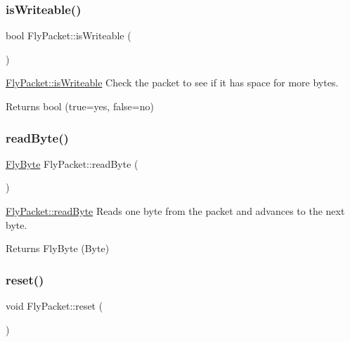 \subsubsection{\texorpdfstring{is\+Writeable()}{isWriteable()}}
{\footnotesize\ttfamily bool Fly\+Packet\+::is\+Writeable (\begin{DoxyParamCaption}{ }\end{DoxyParamCaption})}



\hyperlink{class_fly_packet_a1e63a54895660739a5232b5b546fcf07}{Fly\+Packet\+::is\+Writeable} Check the packet to see if it has space for more bytes. 

\begin{DoxyReturn}{Returns}
bool (true=yes, false=no) 
\end{DoxyReturn}
\hypertarget{class_fly_packet_af3e863f81ee5de3fb73ec200efac0924}{}\label{class_fly_packet_af3e863f81ee5de3fb73ec200efac0924} 
\subsubsection{\texorpdfstring{read\+Byte()}{readByte()}}
{\footnotesize\ttfamily \hyperlink{conversions_8h_a1f006e31a957accfe6aa1bf6f401efce}{Fly\+Byte} Fly\+Packet\+::read\+Byte (\begin{DoxyParamCaption}{ }\end{DoxyParamCaption})}



\hyperlink{class_fly_packet_af3e863f81ee5de3fb73ec200efac0924}{Fly\+Packet\+::read\+Byte} Reads one byte from the packet and advances to the next byte. 

\begin{DoxyReturn}{Returns}
Fly\+Byte (Byte) 
\end{DoxyReturn}
\hypertarget{class_fly_packet_aaac4cf49c1ef150d0e4e59c2377cedd3}{}\label{class_fly_packet_aaac4cf49c1ef150d0e4e59c2377cedd3} 
\subsubsection{\texorpdfstring{reset()}{reset()}}
{\footnotesize\ttfamily void Fly\+Packet\+::reset (\begin{DoxyParamCaption}{ }\end{DoxyParamCaption})}



